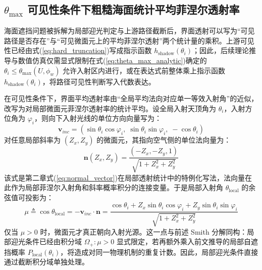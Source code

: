 \subsection{\texorpdfstring{$\theta_{\max}$}{theta max} 可见性条件下粗糙海面统计平均菲涅尔透射率}
\label{subsec:transmission_under_theta_max}

海面遮挡问题被拆解为局部迎光判定与上游路径截断后，界面透射可以写为“可见路径是否存在”与“可见微面元上的平均菲涅尔透射”两个统计量的乘积。上游可见性已经由式(\ref{eq:hard_truncation})写成指示函数 $h_{\mathrm{shadow}}(\theta_i)$；因此，后续理论推导与数值仿真仅需显式限制在式(\ref{eq:theta_max_analytic})确定的 $\theta_i \le \theta_{\max}(U,\phi_w)$ 允许入射区内进行，或在表达式前整体乘上指示函数 $h_{\mathrm{shadow}}(\theta_i)$，将路径可见性判断写入代数表达。

在可见性条件下，界面平均透射率由“全局平均法向对应单一等效入射角”的近似，改写为对局部微面元菲涅尔透射率的统计平均。设全局入射天顶角为 $\theta_i$，入射方位角为 $\varphi_i$，则向下入射光线的单位方向向量写为：
\begin{equation}
	\mathbf{v}_{inc} = \left( \sin\theta_i\cos\varphi_i,\; \sin\theta_i\sin\varphi_i,\; -\cos\theta_i \right)
	\label{eq:incident_vector_transmission}
\end{equation}
对任意局部斜率为 $(Z_x,Z_y)$ 的微面元，其指向空气侧的单位法向量为：
\begin{equation}
	\mathbf{n}(Z_x,Z_y) = \frac{(-Z_x, -Z_y, 1)}{\sqrt{1+Z_x^2+Z_y^2}}
	\label{eq:local_normal_transmission}
\end{equation}
该式是第二章式(\ref{eq:normal_vector})在局部透射统计中的特例化写法，法向量在此作为局部菲涅尔入射角和斜率概率积分的连接变量。于是局部入射角 $\theta_{\mathrm{local}}$ 的余弦值可投影为：
\begin{equation}
	\mu \triangleq \cos\theta_{\mathrm{local}} = -\mathbf{v}_{inc}\cdot \mathbf{n} = \frac{\cos\theta_i + Z_x\sin\theta_i\cos\varphi_i + Z_y\sin\theta_i\sin\varphi_i}{\sqrt{1+Z_x^2+Z_y^2}}
	\label{eq:local_mu_transmission}
\end{equation}
仅当 $\mu>0$ 时，微面元才真正朝向入射光源。这一点与前述 Smith 分解同构：局部迎光条件已经由积分域 $\Omega_+:\mu>0$ 显式限定，若再额外乘入前文推导的局部自遮挡概率 $P_{\mathrm{local}}(\theta_i)$，将造成对同一物理机制的重复计数。因此，局部迎光条件直接通过截断积分域单独处理。

